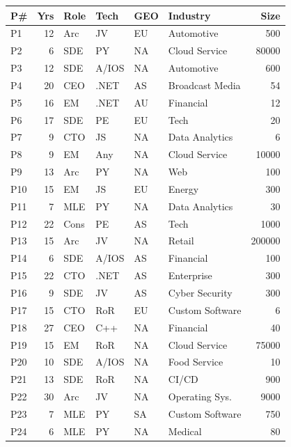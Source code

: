 \begin{figure}
\begin{subfigure}[b]{0.46\textwidth}
    \centering
    \begin{tabular}{p{.4cm}r{.4cm}l{2.5cm}l{2cm}l{2cm}l{2.2cm}r{1.5cm}}%
\toprule
P\# & Yrs & Role & Tech & GEO & Industry & Size \\
    \midrule
P1 & 12 & Arc & JV & EU & Automotive & 500 &  \\ 
P2 & 6 & SDE & PY & NA & Cloud Service & 80000 &  \\ 
P3 & 12 & SDE & A/IOS & NA & Automotive & 600 &  \\ 
P4 & 20 & CEO & .NET & AS & Broadcast Media & 54 &  \\ 
P5 & 16 & EM & .NET & AU & Financial & 12 &  \\ 
P6 & 17 & SDE & PE & EU & Tech & 20 &  \\ 
P7 & 9 & CTO & JS & NA & Data Analytics & 6 &  \\ 
P8 & 9 & EM & Any & NA & Cloud Service & 10000 &  \\ 
P9 & 13 & Arc & PY & NA & Web & 100 &  \\ 
P10 & 15 & EM & JS & EU & Energy & 300 &  \\ 
P11 & 7 & MLE & PY & NA & Data Analytics & 30 &  \\ 
P12 & 22 & Cons & PE & AS & Tech & 1000 &  \\ 
P13 & 15 & Arc & JV & NA & Retail & 200000 &  \\ 
P14 & 6 & SDE & A/IOS & AS & Financial & 100 &  \\ 
P15 & 22 & CTO & .NET & AS & Enterprise & 300 &  \\ 
P16 & 9 & SDE & JV & AS & Cyber Security & 300 &  \\ 
P17 & 15 & CTO & RoR & EU & Custom Software & 6 &  \\ 
P18 & 27 & CEO & C++ & NA & Financial & 40 &  \\ 
P19 & 15 & EM & RoR & NA & Cloud Service & 75000 &  \\ 
P20 & 10 & SDE & A/IOS & NA & Food Service & 10 &  \\ 
P21 & 13 & SDE & RoR & NA & CI/CD & 900 &  \\ 
P22 & 30 & Arc & JV & NA & Operating Sys. & 9000 &  \\ 
P23 & 7 & MLE & PY & SA & Custom Software & 750 &  \\ 
P24 & 6 & MLE & PY & NA & Medical & 80 &  \\ 


\end{tabular}
\end{subfigure}
\end{figure}
